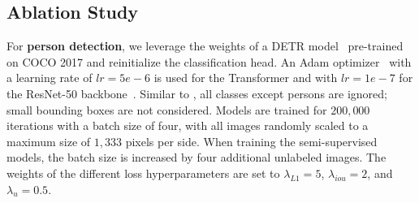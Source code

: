 \documentclass[sigconf]{acmart}
\begin{document}
\subsection{Ablation Study}
\label{chp:ablation}

\label{chp:exp_boxes}
For \textbf{person detection}, we leverage the weights of a \ac{DETR} model~\cite{DBLP:conf/eccv/CarionMSUKZ20} pre-trained on COCO 2017 and reinitialize the classification head. 
An Adam optimizer~\cite{DBLP:journals/corr/KingmaB14} with a learning rate of $lr = 5e-6$ is used for the Transformer and with $lr = 1e-7$ for the ResNet-50 backbone~\cite{DBLP:conf/cvpr/HeZRS16}. Similar to \citet{DBLP:conf/cvpr/0012WZXXT21}, all classes except persons are ignored; small bounding boxes are not considered. 
Models are trained for $200,000$ iterations with a batch size of four, with all images randomly scaled to a maximum size of $1,333$ pixels per side. When training the semi-supervised models, the batch size is increased by four additional unlabeled images. 
The weights of the different loss hyperparameters are set to $\lambda_{L1} = 5$, $\lambda_{iou} = 2$, and $\lambda_u = 0.5$.
\end{document}
